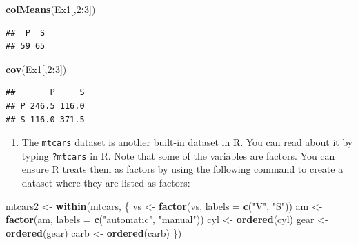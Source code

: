 \documentclass[]{book}
\newenvironment{Shaded}{\begin{snugshade}}{\end{snugshade}}
\newcommand{\DataTypeTok}[1]{\textcolor[rgb]{0.13,0.29,0.53}{#1}}
\newcommand{\DecValTok}[1]{\textcolor[rgb]{0.00,0.00,0.81}{#1}}
\newcommand{\KeywordTok}[1]{\textcolor[rgb]{0.13,0.29,0.53}{\textbf{#1}}}
\newcommand{\NormalTok}[1]{#1}
\newcommand{\OperatorTok}[1]{\textcolor[rgb]{0.81,0.36,0.00}{\textbf{#1}}}
\newcommand{\StringTok}[1]{\textcolor[rgb]{0.31,0.60,0.02}{#1}}
\providecommand{\tightlist}{%
  \setlength{\itemsep}{0pt}\setlength{\parskip}{0pt}}
\theoremstyle{definition}
\theoremstyle{definition}
\theoremstyle{definition}
\theoremstyle{remark}
\begin{document}
\begin{Shaded}
\begin{Highlighting}[]
\KeywordTok{colMeans}\NormalTok{(Ex1[,}\DecValTok{2}\OperatorTok{:}\DecValTok{3}\NormalTok{])}
\end{Highlighting}
\end{Shaded}

\begin{verbatim}
##  P  S 
## 59 65
\end{verbatim}

\begin{Shaded}
\begin{Highlighting}[]
\KeywordTok{cov}\NormalTok{(Ex1[,}\DecValTok{2}\OperatorTok{:}\DecValTok{3}\NormalTok{])}
\end{Highlighting}
\end{Shaded}

\begin{verbatim}
##       P     S
## P 246.5 116.0
## S 116.0 371.5
\end{verbatim}

\begin{enumerate}
\def\labelenumi{\arabic{enumi}.}
\setcounter{enumi}{2}
\tightlist
\item
  The \texttt{mtcars} dataset is another built-in dataset in R. You can read about it by typing \texttt{?mtcars} in R. Note that some of the variables are factors. You can ensure R treats them as factors by using the following command to create a dataset where they are listed as factors:
\end{enumerate}

\begin{Shaded}
\begin{Highlighting}[]
\NormalTok{mtcars2 <-}\StringTok{ }\KeywordTok{within}\NormalTok{(mtcars, \{}
\NormalTok{   vs <-}\StringTok{ }\KeywordTok{factor}\NormalTok{(vs, }\DataTypeTok{labels =} \KeywordTok{c}\NormalTok{(}\StringTok{"V"}\NormalTok{, }\StringTok{"S"}\NormalTok{))}
\NormalTok{   am <-}\StringTok{ }\KeywordTok{factor}\NormalTok{(am, }\DataTypeTok{labels =} \KeywordTok{c}\NormalTok{(}\StringTok{"automatic"}\NormalTok{, }\StringTok{"manual"}\NormalTok{))}
\NormalTok{   cyl  <-}\StringTok{ }\KeywordTok{ordered}\NormalTok{(cyl)}
\NormalTok{   gear <-}\StringTok{ }\KeywordTok{ordered}\NormalTok{(gear)}
\NormalTok{   carb <-}\StringTok{ }\KeywordTok{ordered}\NormalTok{(carb)}
\NormalTok{\})}
\end{Highlighting}
\end{Shaded}
\end{document}
